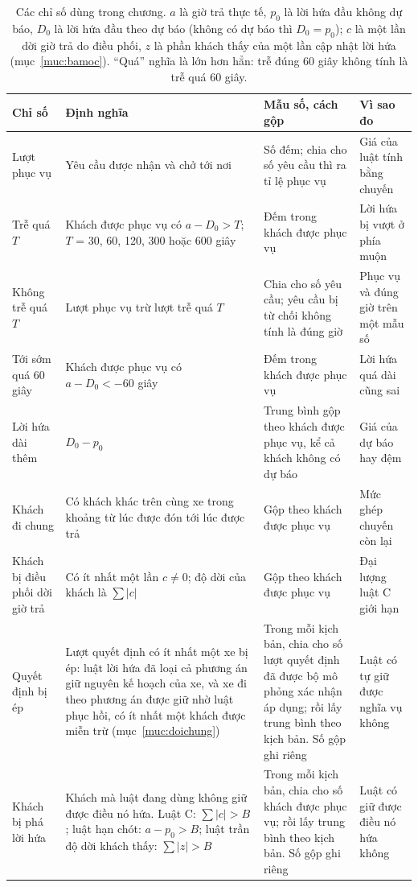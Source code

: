 \begin{table}[htbp]
\centering
\caption{Các chỉ số dùng trong chương. $a$ là giờ trả thực tế, $p_0$ là lời hứa đầu không dự báo, $D_0$
là lời hứa đầu theo dự báo (không có dự báo thì $D_0 = p_0$); $c$ là một lần dời giờ trả do điều phối, $z$ là phần
khách thấy của một lần cập nhật lời hứa (mục~\ref{muc:bamoc}). ``Quá'' nghĩa là lớn hơn hẳn: trễ đúng 60 giây
không tính là trễ quá 60 giây.}
\label{bang:c4-chiso}
\footnotesize
\setlength{\tabcolsep}{3pt}
\begin{tabular}{@{}p{2.7cm}p{5.3cm}p{3.5cm}p{3.5cm}@{}}
\toprule
\textbf{Chỉ số} & \textbf{Định nghĩa} & \textbf{Mẫu số, cách gộp} & \textbf{Vì sao đo}\\
\midrule
Lượt phục vụ & Yêu cầu được nhận và chở tới nơi & Số đếm; chia cho số yêu cầu thì ra tỉ lệ phục vụ & Giá của
luật tính bằng chuyến\\
Trễ quá $T$ & Khách được phục vụ có $a - D_0 > T$; $T$ = 30, 60, 120, 300 hoặc 600 giây & Đếm trong khách
được phục vụ & Lời hứa bị vượt ở phía muộn\\
Không trễ quá $T$ & Lượt phục vụ trừ lượt trễ quá $T$ & Chia cho số yêu cầu; yêu cầu bị từ chối không
tính là đúng giờ & Phục vụ và đúng giờ trên một mẫu số\\
Tới sớm quá 60 giây & Khách được phục vụ có $a - D_0 < -60$ giây & Đếm trong khách được phục vụ & Lời
hứa quá dài cũng sai\\
Lời hứa dài thêm & $D_0 - p_0$ & Trung bình gộp theo khách được phục vụ, kể cả khách không có dự báo & Giá của
dự báo hay đệm\\
Khách đi chung & Có khách khác trên cùng xe trong khoảng từ lúc được đón tới lúc được trả & Gộp theo
khách được phục vụ & Mức ghép chuyến còn lại\\
Khách bị điều phối dời giờ trả & Có ít nhất một lần $c \neq 0$; độ dời của khách là $\sum|c|$ &
Gộp theo khách được phục vụ & Đại lượng luật C giới hạn\\
Quyết định bị ép & Lượt quyết định có ít nhất một xe bị ép: luật lời hứa đã loại cả phương án giữ nguyên kế hoạch
của xe, và xe đi theo phương án được giữ nhờ luật phục hồi, có ít nhất một khách được miễn trừ
(mục~\ref{muc:doichung}) & Trong mỗi kịch bản, chia cho số lượt quyết định đã được bộ mô phỏng xác nhận áp dụng;
rồi lấy trung bình theo kịch bản. Số gộp ghi riêng & Luật có tự giữ được nghĩa vụ không\\
Khách bị phá lời hứa & Khách mà luật đang dùng không giữ được điều nó hứa. Luật C: $\sum|c| > B$; luật hạn chót:
$a - p_0 > B$; luật trần độ dời khách thấy: $\sum|z| > B$ & Trong mỗi kịch bản, chia cho số khách được phục vụ;
rồi lấy trung bình theo kịch bản. Số gộp ghi riêng & Luật có giữ được điều nó hứa không\\
\bottomrule
\end{tabular}
\end{table}
